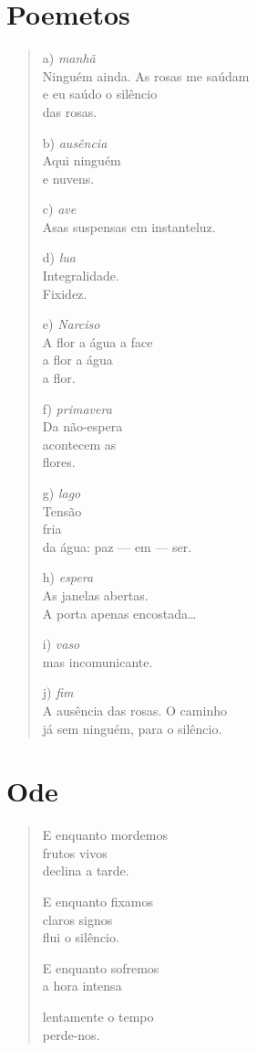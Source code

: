 \chapter{Poemetos}

\begin{verse}
a) \emph{manhã}\\
\quad Ninguém ainda. As rosas me saúdam\\
\quad e eu saúdo o silêncio\\
\quad das rosas.

b) \emph{ausência}\\
\quad Aqui ninguém\\
\quad e nuvens.

c) \emph{ave}\\
\quad Asas suspensas em
\quad instanteluz.

d) \emph{lua}\\
\quad Integralidade.\\
\quad Fixidez.

e) \emph{Narciso}\\
\quad A flor a água a face\\
\quad a flor a água\\
\quad a flor.

f) \emph{primavera}\\
\quad Da não-espera\\
\quad acontecem as\\
\quad flores.

g) \emph{lago}\\
\quad Tensão\\
\quad fria\\
\quad da água: paz --- em --- ser.

h) \emph{espera}\\
\quad As janelas abertas.\\
\quad A porta apenas encostada\ldots{}

i) \emph{vaso}\\
\quad mas incomunicante.

j) \emph{fim}\\
\quad A ausência das rosas. O caminho\\
\quad já sem ninguém, para o silêncio.
\end{verse}

\chapter{Ode}

\begin{verse}
E enquanto mordemos\\
frutos vivos\\
declina a tarde.

E enquanto fixamos\\
claros signos\\
flui o silêncio.

E enquanto sofremos\\
a hora intensa

lentamente o tempo\\
perde-nos.
\end{verse}


